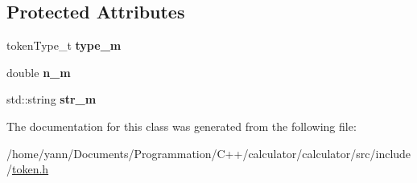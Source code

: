 \subsection*{Protected Attributes}
\begin{DoxyCompactItemize}
\item 
\hypertarget{class_token_a01979ac699ac624615570cf0ea1e5b71}{token\-Type\-\_\-t {\bfseries type\-\_\-m}}\label{class_token_a01979ac699ac624615570cf0ea1e5b71}

\item 
\hypertarget{class_token_ab5e62028b935156e5f69f3a50b20c078}{double {\bfseries n\-\_\-m}}\label{class_token_ab5e62028b935156e5f69f3a50b20c078}

\item 
\hypertarget{class_token_a2781f7d67fae2fa1cbfe4af5caf8473d}{std\-::string {\bfseries str\-\_\-m}}\label{class_token_a2781f7d67fae2fa1cbfe4af5caf8473d}

\end{DoxyCompactItemize}


The documentation for this class was generated from the following file\-:\begin{DoxyCompactItemize}
\item 
/home/yann/\-Documents/\-Programmation/\-C++/calculator/calculator/src/include/\hyperlink{token_8h}{token.\-h}\end{DoxyCompactItemize}
